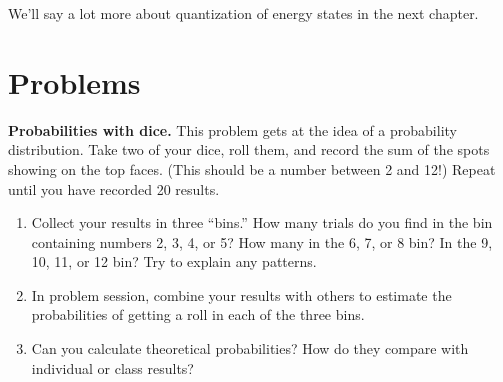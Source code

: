We'll say a lot more about quantization of energy states in the next chapter.

\newpage

\section*{Problems}



\begin{problem} 
 {\bf Probabilities with dice.} This problem gets at the idea of a
 probability distribution. Take two of your dice, roll them, and
 record the sum of the spots showing on the top faces.  (This should
 be a number between 2 and 12!)  Repeat until you have recorded 20
 results.
   \begin{enumerate}
   \item  Collect your results in three ``bins.''  How many trials do
   you find in the bin containing numbers 2, 3, 4, or 5? How many in
   the 6, 7, or 8 bin?  In the 9, 10, 11, or 12 bin?  Try to explain any
   patterns.
   \item  In problem session, combine your results with others to
   estimate the  probabilities of getting a roll in each of the three
   bins.
   \item Can you calculate theoretical probabilities?  How do they
    compare with individual or class results?
   \end{enumerate}
\label{prob:dice}
\end{problem}



